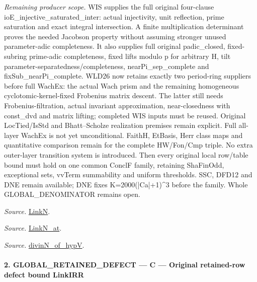 \documentclass[11pt,a4paper]{article}
\numberwithin{equation}{section}
\theoremstyle{remark}\newtheorem{remark}[theorem]{Remark}
\begin{document}
\emph{Remaining producer scope.} WIS supplies the full original four-clause ioE\_\allowbreak injective\_\allowbreak saturated\_\allowbreak inter: actual injectivity, unit reflection, prime saturation and exact integral intersection. A finite multiplication determinant proves the needed Jacobson property without assuming stronger unused parameter-adic completeness. It also supplies full original padic\_\allowbreak closed, fixed-subring prime-adic completeness, fixed lifts modulo p for arbitrary H, tilt parameter-separatedness/completeness, nearPi\_\allowbreak sep\_\allowbreak complete and fixSub\_\allowbreak nearPi\_\allowbreak complete. WLD26 now retains exactly two period-ring suppliers before full WachEx: the actual Wach prism and the remaining homogeneous cyclotomic-kernel-fixed Frobenius matrix descent. The latter still needs Frobenius-filtration, actual invariant approximation, near-closedness with const\_\allowbreak dvd and matrix lifting; completed WIS inputs must be reused. Original LocTied/IsStd and Bhatt–Scholze realization premises remain explicit. Full all-layer WachEx is not yet unconditional. FaithH, EtBasis, Herr class maps and quantitative comparison remain for the complete HW/Fon/Cmp triple. No extra outer-layer transition system is introduced. Then every original local row/table bound must hold on one common ConclF family, retaining ShaFinOdd, exceptional sets, vvTerm summability and uniform thresholds. SSC, DFD12 and DNE remain available; DNE fixes K=2000(|Ca|+1)\textasciicircum{}3 before the family. Whole GLOBAL\_\allowbreak DENOMINATOR remains open.

\emph{Source.} \href{https://github.com/CocoSgt/riemann-hypothesis-lean/blob/7cbf7a0c32fca1badf05931879a37c3f8a2b03b4/src/Formalism/SharpRestriction/GlobalTheoremInputs.lean#L45-L48}{LinkN}.

\emph{Source.} \href{https://github.com/CocoSgt/riemann-hypothesis-lean/blob/7cbf7a0c32fca1badf05931879a37c3f8a2b03b4/src/Formalism/SharpRestriction/GlobalTheoremInputs.lean#L40-L44}{LinkN\_\allowbreak at}.

\emph{Source.} \href{https://github.com/CocoSgt/riemann-hypothesis-lean/blob/7cbf7a0c32fca1badf05931879a37c3f8a2b03b4/src/Development/AutomorphicArithmetic/CharacterBoxes/DivinNOfHypV.lean#L117-L134}{divinN\_\allowbreak of\_\allowbreak hypV}.



\paragraph{2. GLOBAL\_\allowbreak RETAINED\_\allowbreak DEFECT — C — Original retained-row defect bound LinkIRR}
\end{document}
